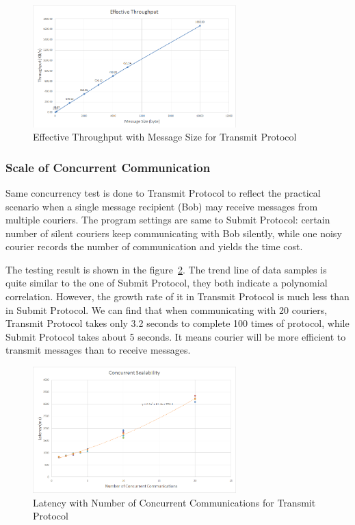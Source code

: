\begin{figure}[h!]
\centering
\includegraphics[width=0.7\textwidth,natwidth=861,natheight=515]{figures/effectivethroughputtransmit.png}
\caption{Effective Throughput with Message Size for Transmit Protocol}
\label{fig:effectivethroughputtransmit}
\end{figure}

\subsubsection{Scale of Concurrent Communication}
Same concurrency test is done to Transmit Protocol to reflect the practical scenario when a single message recipient (Bob) may receive messages from multiple couriers. The program settings are same to Submit Protocol: certain number of silent couriers keep communicating with Bob silently, while one noisy courier records the number of communication and yields the time cost. 

The testing result is shown in the figure~\ref{fig:concurrenttransmit}. The trend line of data samples is quite similar to the one of Submit Protocol, they both indicate a polynomial correlation. However, the growth rate of it in Transmit Protocol is much less than in Submit Protocol. We can find that when communicating with 20 couriers, Transmit Protocol takes only 3.2 seconds to complete 100 times of protocol, while Submit Protocol takes about 5 seconds. It means courier will be more efficient to transmit messages than to receive messages.

\begin{figure}[h!]
\centering
\includegraphics[width=0.7\textwidth,natwidth=857,natheight=531]{figures/concurrenttransmit.png}
\caption{Latency with Number of Concurrent Communications for Transmit Protocol}
\label{fig:concurrenttransmit}
\end{figure}

